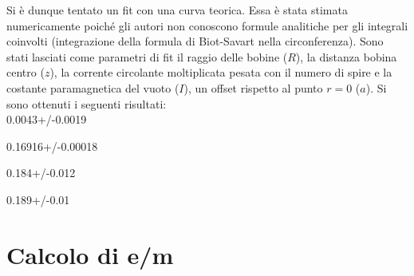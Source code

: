 \documentclass[10pt,a4paper]{article}
\begin{document}
Si è dunque tentato un fit con una curva teorica. Essa è stata stimata numericamente poiché gli autori non conoscono formule analitiche per gli integrali coinvolti (integrazione della formula di Biot-Savart nella circonferenza). Sono stati lasciati come parametri di fit il raggio delle bobine ($R$), la distanza bobina centro ($z$), la corrente circolante moltiplicata pesata con il numero di spire e la costante paramagnetica del vuoto ($I$), un offset rispetto al punto $r=0$ ($a$). Si sono ottenuti i seguenti risultati:\\

0.0043+/-0.0019

0.16916+/-0.00018

0.184+/-0.012

0.189+/-0.01

 
 

\section{Calcolo di e/m}


\end{document}
